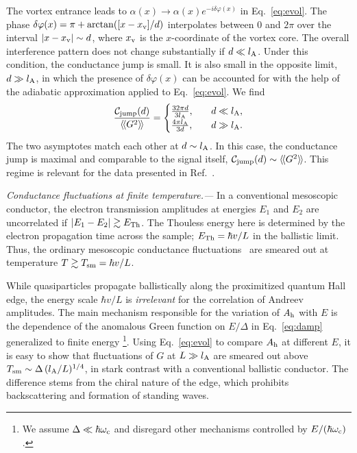 \documentclass[reprint,
superscriptaddress,
amsmath,
amssymb,
aps,
prl,
floatfix,
english
]{revtex4-2}
\newcommand{\lprox}{L}
\newcommand{\lA}{l_{\rm A}}
\newcommand{\dv}{d}
\newcommand{\Cjump}{{\cal C}_{\rm jump}}
\newcommand{\he}{A_{\rm h}}
\newcommand{\rngl}{\rangle\hspace{-0.05cm}\rangle}
\newcommand{\lngl}{\langle\hspace{-0.05cm}\langle}
\begin{document}
The vortex entrance leads to $\alpha(x) \rightarrow \alpha(x)e^{-i\delta \varphi(x)}$ in Eq.~\eqref{eq:evol}.  
The phase $\delta \varphi(x) = \pi + \arctan ([x - x_{\rm v}]/\dv)$ interpolates between $0$ and $2\pi$ over the interval $|x - x_{\rm v}| \sim d$, where $x_{\rm v}$ is the $x$-coordinate of the vortex core. The overall interference pattern does not change substantially if $\dv \ll \lA$. Under this condition, the conductance jump is small. 
It is also small in the opposite limit, $\dv \gg \lA$, in which the presence of $\delta \varphi(x)$ 
can be accounted for with the help of the adiabatic approximation applied to Eq.~\eqref{eq:evol}. We find~\cite{sm}
\begin{equation}\label{eq:jump}
    \frac{\Cjump(\dv)}{\lngl G^2 \rngl} =
    \begin{cases}
    \frac{32\pi d}{3\lA},&\quad d\ll \lA,\\
    \frac{4\pi \lA}{3d},&\quad d \gg \lA. 
    \end{cases}
\end{equation}
The two asymptotes match each other at $\dv \sim \lA$. In this case, the conductance jump is maximal and comparable to the signal itself, $\Cjump(\dv) \sim \lngl G^2 \rngl$. This regime is relevant for the data presented in Ref.~\cite{zhao2020}.

\textit{Conductance fluctuations at finite temperature.---}
In a conventional mesoscopic conductor, the electron transmission amplitudes at energies $E_1$ and $E_2$ are uncorrelated if $|E_1 - E_2| \gtrsim E_{\rm Th}$.
The Thouless energy here is determined by the electron propagation time across the sample; $E_{\rm Th} = \hbar v / L$ in the ballistic limit.
Thus, the ordinary mesoscopic conductance fluctuations~\cite{altshuler1985,lee1985} are smeared out at temperature $T \gtrsim T_{\rm sm} = \hbar v/ L$.

While quasiparticles propagate ballistically along the proximitized quantum Hall edge,
the energy scale $ \hbar v / L$ is \textit{irrelevant} for the correlation of Andreev amplitudes. 
The main mechanism responsible for the variation of $\he$ with $E$ is the dependence of the anomalous Green function on $E / \Delta$ in Eq.~\eqref{eq:damp} generalized to finite energy \footnote{We assume $\Delta \ll \hbar \omega_{\rm c}$ and disregard other mechanisms controlled by $E / (\hbar \omega_{\rm c})$.}.
Using Eq.~\eqref{eq:evol} to compare $\he$ at different $E$, it is easy to show that fluctuations of $G$ at $\lprox \gg \lA$ are smeared out above $T_{\rm sm} \sim \Delta\,(\lA / \lprox)^{1/4}$, in stark contrast with a conventional ballistic conductor.
The difference stems from
the chiral nature of the edge, which prohibits backscattering and formation of standing waves.
\end{document}
